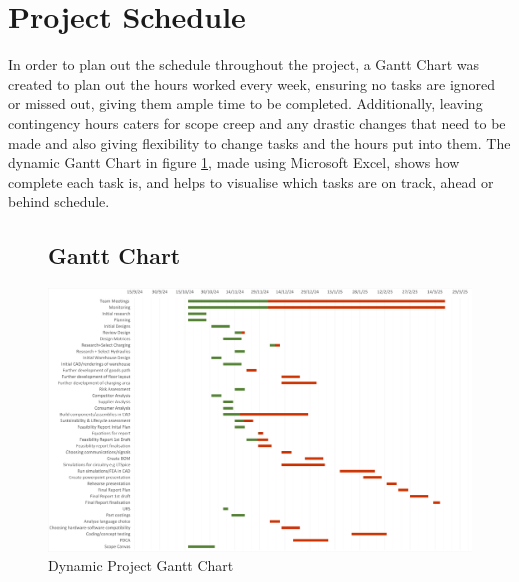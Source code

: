 \documentclass[12pt]{article}
\begin{document}
 

\section{Project Schedule}

In order to plan out the schedule throughout the project, a Gantt Chart was created to plan out the hours worked every week, ensuring no tasks are ignored or missed out, giving them ample time to be completed. Additionally, leaving contingency hours caters for scope creep and any drastic changes that need to be made and also giving flexibility to change tasks and the hours put into them. The dynamic Gantt Chart in  figure \ref{fig:x}, made using Microsoft Excel, shows how complete each task is, and helps to visualise which tasks are on track, ahead or behind schedule. 
\begin{figure}[h!]
 \subsection{Gantt Chart}
    \includegraphics[width=1\textwidth]{BIGGER Gantt chart.png}
    \caption{Dynamic Project Gantt Chart}
    \label{fig:x}
\end{figure}
\end{document}
